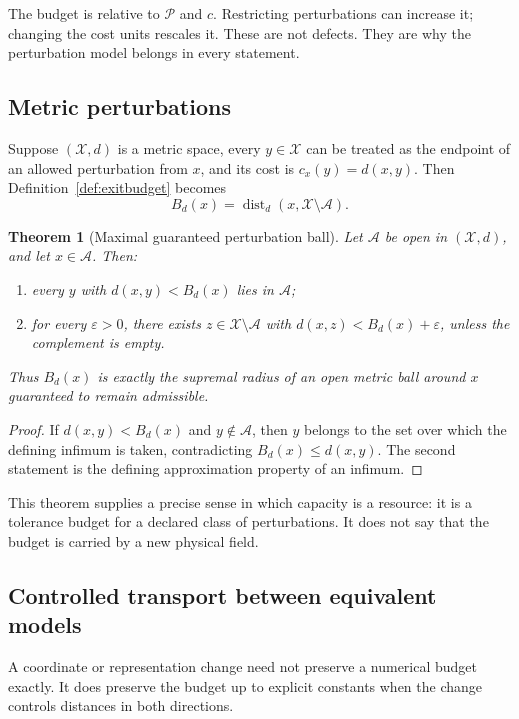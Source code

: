 \documentclass[11pt]{article}
\newtheorem{theorem}{Theorem}[section]
\theoremstyle{definition}
\theoremstyle{remark}
\newcommand{\cA}{\mathcal A}
\newcommand{\cP}{\mathcal P}
\newcommand{\cX}{\mathcal X}
\newcommand{\dist}{\operatorname{dist}}
\begin{document}
The budget is relative to \(\cP\) and \(c\).  Restricting perturbations can
increase it; changing the cost units rescales it.  These are not defects.
They are why the perturbation model belongs in every statement.

\subsection{Metric perturbations}

Suppose \((\cX,d)\) is a metric space, every \(y\in\cX\) can be treated as
the endpoint of an allowed perturbation from \(x\), and its cost is
\(c_x(y)=d(x,y)\).  Then Definition~\ref{def:exitbudget} becomes
\[
 B_d(x)=\dist_d(x,\cX\setminus\cA).
\]

\begin{theorem}[Maximal guaranteed perturbation ball]
\label{thm:ball}
Let \(\cA\) be open in \((\cX,d)\), and let \(x\in\cA\).  Then:
\begin{enumerate}[leftmargin=2em]
\item every \(y\) with \(d(x,y)<B_d(x)\) lies in \(\cA\);
\item for every \(\varepsilon>0\), there exists
      \(z\in\cX\setminus\cA\) with
      \(d(x,z)<B_d(x)+\varepsilon\), unless the complement is empty.
\end{enumerate}
Thus \(B_d(x)\) is exactly the supremal radius of an open metric ball around
\(x\) guaranteed to remain admissible.
\end{theorem}

\begin{proof}
If \(d(x,y)<B_d(x)\) and \(y\notin\cA\), then \(y\) belongs to the set over
which the defining infimum is taken, contradicting
\(B_d(x)\le d(x,y)\).  The second statement is the defining approximation
property of an infimum.
\end{proof}

This theorem supplies a precise sense in which capacity is a resource:
it is a tolerance budget for a declared class of perturbations.  It does
not say that the budget is carried by a new physical field.

\subsection{Controlled transport between equivalent models}

A coordinate or representation change need not preserve a numerical budget
exactly.  It does preserve the budget up to explicit constants when the
change controls distances in both directions.
\end{document}
